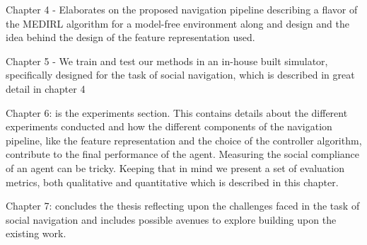 Chapter 4 - Elaborates on the proposed navigation pipeline describing a flavor of the MEDIRL algorithm for a model-free environment along and design and the idea behind the design of the feature representation used.

Chapter 5 - We train and test our methods in an in-house built simulator, specifically designed for the task of social navigation, which is described in great detail in chapter 4

Chapter 6: is the experiments section. This contains details about the different experiments conducted and how the different components of the navigation pipeline, like the feature representation and the choice of the controller algorithm, contribute to the final performance of the agent. Measuring the social compliance of an agent can be tricky. Keeping that in mind we present a set of evaluation metrics, both qualitative and quantitative which is described in this chapter.

Chapter 7: concludes the thesis reflecting upon the challenges faced in the task of social navigation and includes possible avenues to explore building upon the existing work.
